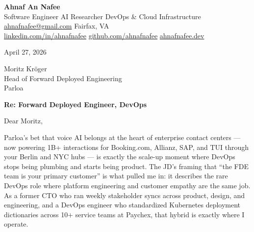 \documentclass[letterpaper,11pt]{article}
\begin{document}
\begin{center}
  {\LARGE\bfseries\color{accent} Ahnaf An Nafee}\\[3pt]
  {\small Software Engineer \textbar{} AI Researcher \textbar{} DevOps \& Cloud Infrastructure}\\[4pt]
  \small
  \href{mailto:ahnafnafee@gmail.com}{ahnafnafee@gmail.com} \textbar{}
  Fairfax, VA\\
  \href{https://linkedin.com/in/ahnafnafee}{linkedin.com/in/ahnafnafee} \textbar{}
  \href{https://github.com/ahnafnafee}{github.com/ahnafnafee} \textbar{}
  \href{https://www.ahnafnafee.dev}{ahnafnafee.dev}
\end{center}

\vspace{20pt}

April 27, 2026

Moritz Kröger\\
Head of Forward Deployed Engineering\\
Parloa

\textbf{Re: Forward Deployed Engineer, DevOps}

Dear Moritz,

Parloa's bet that voice AI belongs at the heart of enterprise contact centers --- now powering 1B+ interactions for Booking.com, Allianz, SAP, and TUI through your Berlin and NYC hubs --- is exactly the scale-up moment where DevOps stops being plumbing and starts being product. The JD's framing that ``the FDE team is your primary customer'' is what pulled me in: it describes the rare DevOps role where platform engineering and customer empathy are the same job. As a former CTO who ran weekly stakeholder syncs across product, design, and engineering, and a DevOps engineer who standardized Kubernetes deployment dictionaries across 10+ service teams at Paychex, that hybrid is exactly where I operate.
\end{document}
